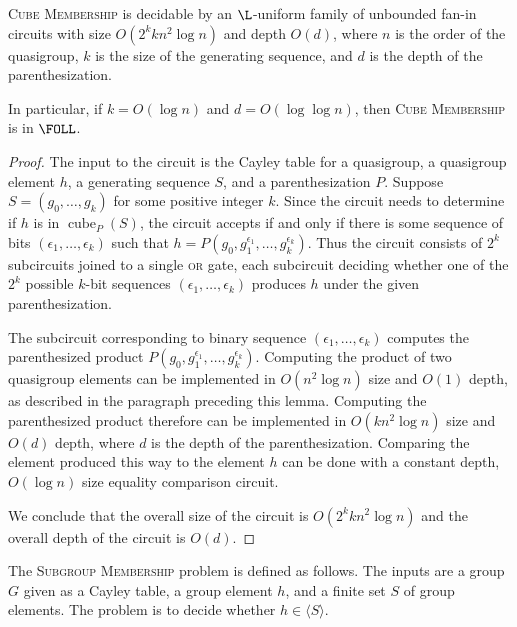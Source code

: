 \documentclass{article}
\newcommand{\gen}[1]{\langle #1 \rangle}
\DeclareMathOperator{\cube}{cube}
\begin{document}
\begin{lemma}\label{lem:cubemem}
  \textsc{Cube Membership} is decidable by an $\L$-uniform family of unbounded fan-in circuits with size $O(2^k k n^2 \log n)$ and depth $O(d)$, where $n$ is the order of the quasigroup, $k$ is the size of the generating sequence, and $d$ is the depth of the parenthesization.

  In particular, if $k = O(\log n)$ and $d = O(\log \log n)$, then \textsc{Cube Membership} is in $\FOLL$.
\end{lemma}
\begin{proof}
  The input to the circuit is the Cayley table for a quasigroup, a quasigroup element $h$, a generating sequence $S$, and a parenthesization $P$.
  Suppose $S = (g_0, \dotsc, g_k)$ for some positive integer $k$.
  Since the circuit needs to determine if $h$ is in $\cube_P(S)$, the circuit accepts if and only if there is some sequence of bits $(\epsilon_1, \dotsc, \epsilon_k)$ such that $h = P(g_0, g_1^{\epsilon_1}, \dotsc, g_k^{\epsilon_k})$.
  Thus the circuit consists of $2^k$ subcircuits joined to a single \textsc{or} gate, each subcircuit deciding whether one of the $2^k$ possible $k$-bit sequences $(\epsilon_1, \dotsc, \epsilon_k)$ produces $h$ under the given parenthesization.

  The subcircuit corresponding to binary sequence $(\epsilon_1, \dotsc, \epsilon_k)$ computes the parenthesized product $P(g_0, g_1^{\epsilon_1}, \dotsc, g_k^{\epsilon_k})$.
  Computing the product of two quasigroup elements can be implemented in $O(n^2 \log n)$ size and $O(1)$ depth, as described in the paragraph preceding this lemma.
  Computing the parenthesized product therefore can be implemented in $O(k n^2 \log n)$ size and $O(d)$ depth, where $d$ is the depth of the parenthesization.
  Comparing the element produced this way to the element $h$ can be done with a constant depth, $O(\log n)$ size equality comparison circuit.

  We conclude that the overall size of the circuit is $O(2^k k n^2 \log n)$ and the overall depth of the circuit is $O(d)$.
\end{proof}

The \textsc{Subgroup Membership} problem is defined as follows.
The inputs are a group $G$ given as a Cayley table, a group element $h$, and a finite set $S$ of group elements.
The problem is to decide whether $h \in \gen{S}$.
\end{document}
